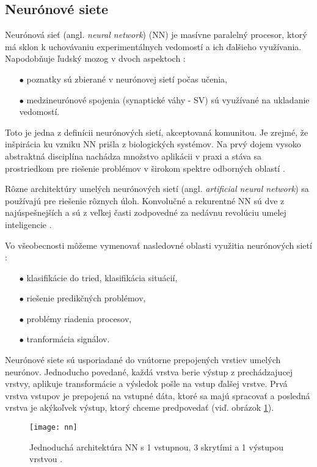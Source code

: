 \subsection{Neurónové siete}
\label{subsec:neuralnetworks}
Neurónová sieť (angl. \textit{neural network}) (NN) je masívne paralelný procesor, ktorý má sklon k uchovávaniu experimentálnych vedomostí a ich ďalšieho využívania.
Napodobňuje ľudský mozog v dvoch aspektoch \cite{odkaz:NNIntroduction}:
\begin{enumerate}
	\item[$\bullet$] poznatky sú zbierané v neurónovej sietí počas učenia,
	\item[$\bullet$] medzineurónové spojenia (synaptické váhy - SV) sú využívané na ukladanie vedomostí.
\end{enumerate}
Toto je jedna z definícii neurónových sietí, akceptovaná komunitou.
Je zrejmé, že inšpirácia ku vzniku NN prišla z biologických systémov.
Na prvý dojem vysoko abstraktná disciplína nachádza množstvo aplikácii v praxi a stáva sa prostriedkom pre riešenie problémov v širokom spektre odborných oblastí \cite{odkaz:NNIntroduction}.

Rôzne architektúry umelých neurónových sietí (angl. \textit{artificial neural network}) sa používajú pre riešenie rôznych úloh.
Konvolučné a rekurentné NN sú dve z najúspešnejších a sú z veľkej časti zodpovedné za nedávnu revolúciu umelej inteligencie \cite{odkaz:CorrectionOfImageOrentation}.

Vo všeobecnosti môžeme vymenovať nasledovné oblasti využitia neurónových sietí \cite{odkaz:NNIntroduction}:
\begin{enumerate}
    \item[$\bullet$] klasifikácie do tried, klasifikácia situácií,
    \item[$\bullet$] riešenie predikčných problémov,
    \item[$\bullet$] problémy riadenia procesov,
    \item[$\bullet$] tranformácia signálov.
\end{enumerate}

Neurónové siete sú usporiadané do vnútorne prepojených vrstiev umelých neurónov.
Jednoducho povedané, každá vrstva berie výstup z prechádzajucej vrstvy, aplikuje transformácie a výsledok pošle na vstup ďalšej vrstve.
Prvá vrstva vstupov je prepojená na vstupné dáta, ktoré sa majú spracovať a posledná vrstva je akýkoľvek výstup, ktorý chceme predpovedať \cite{odkaz:CorrectionOfImageOrentation} (viď. obrázok \ref{pic:NNExample}).
\begin{figure}[H]
	\centering
	\texttt{[image: nn]}
	\caption{Jednoduchá architektúra NN s 1 vstupnou, 3 skrytími a 1 výstupou vrstvou \cite{odkaz:CorrectionOfImageOrentation}.}
	\label{pic:NNExample}
\end{figure}

